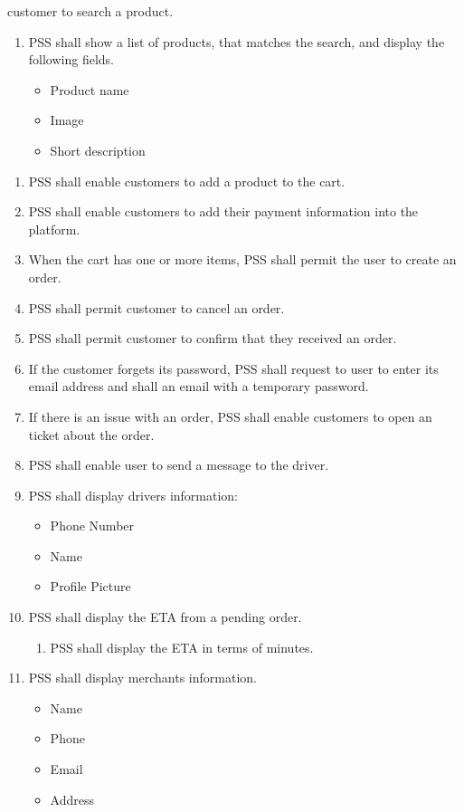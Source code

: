 \begin{enumerate}[label=SY-\arabic*]
    customer to search a product.
    \begin{enumerate}[label=SY-8.\arabic*]
        \item PSS shall show a list of products, that matches the search, 
        and display the following fields.
        \begin{itemize}
            \item Product name
            \item Image 
            \item Short description
        \end{itemize}
    \end{enumerate}
    \end{enumerate}
    \begin{enumerate}[resume, label=SY-\arabic*]
    \item PSS shall enable customers to add a product to the cart.
    \item PSS shall enable customers to add their payment information 
    into the platform.
    \item When the cart has one or more items, PSS shall permit the user to 
    create an order.
    \item PSS shall permit customer to cancel an order.
    \item PSS shall permit customer to confirm that they received an order.
    \item If the customer forgets its password, PSS shall request to user to 
    enter its email address and shall an email with a temporary password.
    \item If there is an issue with an order, PSS shall enable customers to 
    open an ticket about the order.
    \item PSS shall enable user to send a message to the driver.
    \item PSS shall display drivers information:
    \begin{itemize}
        \item Phone Number
        \item Name
        \item Profile Picture
    \end{itemize}
    \item PSS shall display the ETA from a pending order.
    \begin{enumerate}[label=SY-18.\arabic*]
        \item PSS shall display the ETA in terms of minutes.
    \end{enumerate}
    \item PSS shall display merchants information.
    \begin{itemize}
        \item Name
        \item Phone 
        \item Email 
        \item Address
    \end{itemize}
\end{enumerate}


